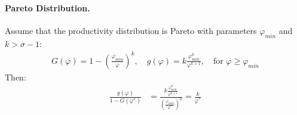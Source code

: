 \begin{solution}
    \paragraph{Pareto Distribution.} Assume that the productivity distribution is Pareto with parameters $\varphi_{min}$ and $k > \sigma - 1$:
    \begin{align*}
        G(\varphi) = 1 - \left( \frac{\varphi_{min}}{\varphi} \right)^k, \quad g(\varphi) = k \frac{\varphi_{min}^k}{\varphi^{k+1}}, \quad \text{for } \varphi \geq \varphi_{min}
    \end{align*}
    Then:
    \begin{align*}
        \frac{g(\varphi)}{1 - G(\varphi^*)} &= \frac{k \frac{\varphi_{min}^k}{\varphi^{k+1}}}{\left( \frac{\varphi_{min}}{\varphi^*} \right)^k} = \frac{k}{\varphi^*} 
    \end{align*}



















\end{solution}